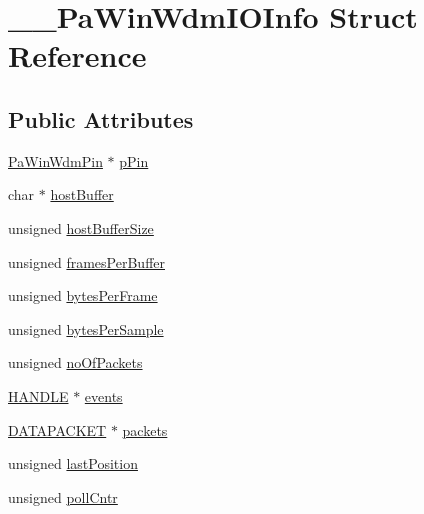 \hypertarget{struct_____pa_win_wdm_i_o_info}{}\section{\+\_\+\+\_\+\+Pa\+Win\+Wdm\+I\+O\+Info Struct Reference}
\label{struct_____pa_win_wdm_i_o_info}
\subsection*{Public Attributes}
\begin{DoxyCompactItemize}
\item 
\hyperlink{pa__win__wdmks_8c_a1b9a07297c7f8093f59fc4b333c9ba68}{Pa\+Win\+Wdm\+Pin} $\ast$ \hyperlink{struct_____pa_win_wdm_i_o_info_a84417e7854458897d856bb65f6161299}{p\+Pin}
\item 
char $\ast$ \hyperlink{struct_____pa_win_wdm_i_o_info_ab2726db73e01500b5088f535ac766738}{host\+Buffer}
\item 
unsigned \hyperlink{struct_____pa_win_wdm_i_o_info_a6d8bb24a84a455a3621d7d357160fc39}{host\+Buffer\+Size}
\item 
unsigned \hyperlink{struct_____pa_win_wdm_i_o_info_ad80e8655e6f5dae1c751a2345d03456a}{frames\+Per\+Buffer}
\item 
unsigned \hyperlink{struct_____pa_win_wdm_i_o_info_ac2141aef40e9aee4a859b91794ec0fc4}{bytes\+Per\+Frame}
\item 
unsigned \hyperlink{struct_____pa_win_wdm_i_o_info_af6be7951457618844e4df735a0f64c90}{bytes\+Per\+Sample}
\item 
unsigned \hyperlink{struct_____pa_win_wdm_i_o_info_a09ddd7e42c3b90a750e3769f20258201}{no\+Of\+Packets}
\item 
\hyperlink{_sound_touch_d_l_l_8h_aa8c0374618b33785ccb02f74bcfebc46}{H\+A\+N\+D\+LE} $\ast$ \hyperlink{struct_____pa_win_wdm_i_o_info_ad1e42dc04910385e2d5daa31318c5c7d}{events}
\item 
\hyperlink{pa__win__wdmks_8c_a6d1fcd4c734c4938cadbb326520d2026}{D\+A\+T\+A\+P\+A\+C\+K\+ET} $\ast$ \hyperlink{struct_____pa_win_wdm_i_o_info_ad1658ab65cd0eaf8d0c0c3b1904125df}{packets}
\item 
unsigned \hyperlink{struct_____pa_win_wdm_i_o_info_a9531d0af0db86e249feae8339dd7bfaf}{last\+Position}
\item 
unsigned \hyperlink{struct_____pa_win_wdm_i_o_info_a759db1d44a817fa5b51e8a81fe80d038}{poll\+Cntr}
\end{DoxyCompactItemize}


